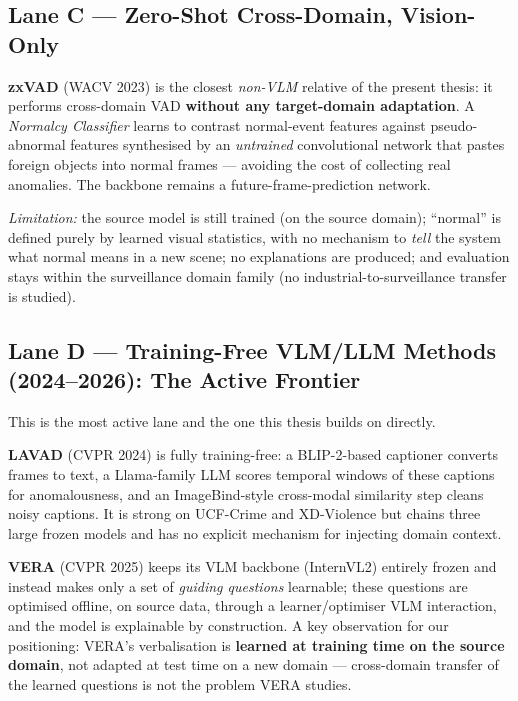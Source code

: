 \documentclass[12pt, a4paper]{article}
\begin{document}
\subsection{Lane C --- Zero-Shot Cross-Domain, Vision-Only}

\textbf{zxVAD} (WACV 2023) is the closest \textit{non-VLM} relative of the
present thesis: it performs cross-domain VAD \textbf{without any target-domain
adaptation}. A \textit{Normalcy Classifier} learns to contrast normal-event
features against pseudo-abnormal features synthesised by an
\textit{untrained} convolutional network that pastes foreign objects into
normal frames --- avoiding the cost of collecting real anomalies. The
backbone remains a future-frame-prediction network.

\textit{Limitation:} the source model is still trained (on the source
domain); ``normal'' is defined purely by learned visual statistics, with no
mechanism to \textit{tell} the system what normal means in a new scene; no
explanations are produced; and evaluation stays within the surveillance
domain family (no industrial-to-surveillance transfer is studied).

\subsection{Lane D --- Training-Free VLM/LLM Methods (2024--2026): The Active Frontier}

This is the most active lane and the one this thesis builds on directly.

\textbf{LAVAD} (CVPR 2024) is fully training-free: a BLIP-2-based captioner
converts frames to text, a Llama-family LLM scores temporal windows of these
captions for anomalousness, and an ImageBind-style cross-modal similarity
step cleans noisy captions. It is strong on UCF-Crime and XD-Violence but
chains three large frozen models and has no explicit mechanism for injecting
domain context.

\textbf{VERA} (CVPR 2025) keeps its VLM backbone (InternVL2) entirely frozen
and instead makes only a set of \textit{guiding questions} learnable; these
questions are optimised offline, on source data, through a learner/optimiser
VLM interaction, and the model is explainable by construction. A key
observation for our positioning: VERA's verbalisation is \textbf{learned at
training time on the source domain}, not adapted at test time on a new
domain --- cross-domain transfer of the learned questions is not the problem
VERA studies.
\end{document}
